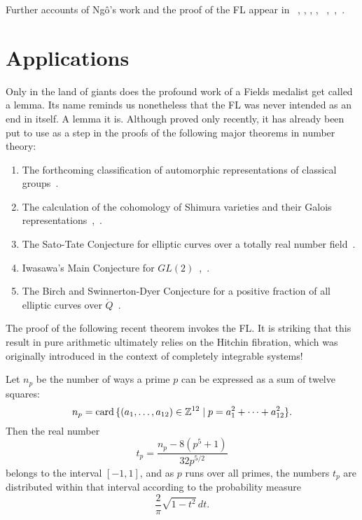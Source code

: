 Further accounts of Ng\^o's work and the proof of the FL appear in
~\cite{Nadler:2010}, \cite{Dat:2004}, \cite{Arthur:2010},
\cite{DN:2010},
~\cite{CHLaumon:2010},~\cite{Cass:2010},~\cite{NBC:report:2010}.




\section{Applications}

Only in the land of giants does the profound work of a Fields medalist get
called a lemma.  Its name reminds us nonetheless that the FL was never
intended as an end in itself.  A lemma it is.  Although proved only
recently, it has already been put to use as a step in the proofs of
the following major theorems in number theory:

\begin{enumerate}
\item The forthcoming classification of automorphic
  representations of classical groups~\cite{Arthur:2011}.
\item The calculation of the cohomology of Shimura
  varieties and their Galois representations~\cite{Morel:2010},~\cite{Shin:2010}.
\item The Sato-Tate Conjecture for elliptic curves over a totally real
  number field~\cite{BGHT:2010}.
\item Iwasawa's Main Conjecture for
  $GL(2)$~\cite{Skinner-Urban:2010},~\cite{Skinner:2010}.
\item The Birch and Swinnerton-Dyer Conjecture  for a
positive fraction of all elliptic curves over $\ring{Q}$~\cite{BS:2010}.
\end{enumerate}

The proof of the following recent theorem invokes the FL.  
It is striking that this result in pure
arithmetic ultimately relies on the Hitchin fibration, which
was originally introduced in the context of completely integrable
systems!

\begin{thm} 
  Let $n_p$ be the number of ways a prime $p$ can be expressed as a
  sum of twelve squares:
\[
n_p = {\operatorname{card}}\,\{ (a_1,\ldots,a_{12})\in\mathbb{Z}^{12} \mid p = a_1^2 +\cdots +
  a_{12}^2 \}.
\]
Then the real number
\[
t_p = \frac{n_p -  8 (p^5 + 1)}{32 p^{5/2}}
\]
belongs to the interval $[-1,1]$, and as $p$ runs over all primes, the
numbers $t_p$ are distributed within that interval according to the
probability measure
\[
\frac{2}{\pi} \sqrt{1-t^2} \, dt.
\]
\end{thm}


